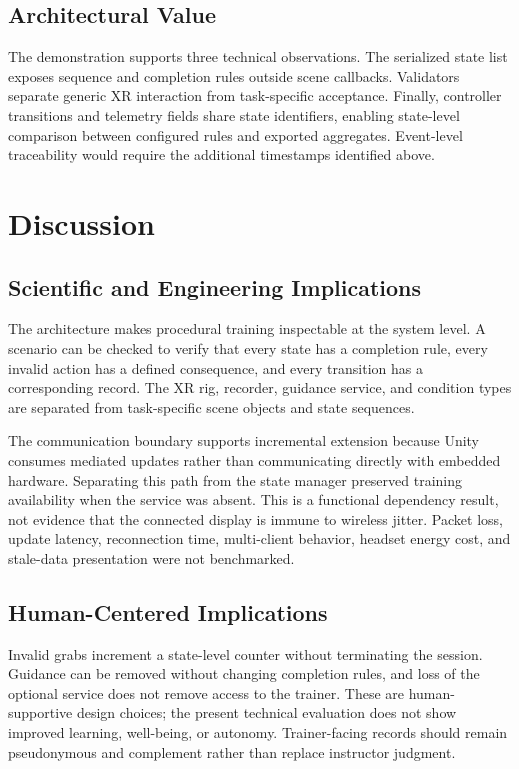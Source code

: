 \documentclass[conference]{IEEEtran}
\begin{document}
\subsection{Architectural Value}

The demonstration supports three technical observations. The serialized state list exposes sequence and completion rules outside scene callbacks. Validators separate generic XR interaction from task-specific acceptance. Finally, controller transitions and telemetry fields share state identifiers, enabling state-level comparison between configured rules and exported aggregates. Event-level traceability would require the additional timestamps identified above.

\section{Discussion}

\subsection{Scientific and Engineering Implications}

The architecture makes procedural training inspectable at the system level. A scenario can be checked to verify that every state has a completion rule, every invalid action has a defined consequence, and every transition has a corresponding record. The XR rig, recorder, guidance service, and condition types are separated from task-specific scene objects and state sequences.

The communication boundary supports incremental extension because Unity consumes mediated updates rather than communicating directly with embedded hardware. Separating this path from the state manager preserved training availability when the service was absent. This is a functional dependency result, not evidence that the connected display is immune to wireless jitter. Packet loss, update latency, reconnection time, multi-client behavior, headset energy cost, and stale-data presentation were not benchmarked.

\subsection{Human-Centered Implications}

Invalid grabs increment a state-level counter without terminating the session. Guidance can be removed without changing completion rules, and loss of the optional service does not remove access to the trainer. These are human-supportive design choices; the present technical evaluation does not show improved learning, well-being, or autonomy. Trainer-facing records should remain pseudonymous and complement rather than replace instructor judgment.
\end{document}
